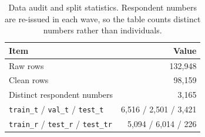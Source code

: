 \begin{table}[t]
\centering
\small
\begin{tabular}{lr}
\toprule
Item & Value \\
\midrule
Raw rows & 132,948 \\
Clean rows & 98,159 \\
Distinct respondent numbers & 3,165 \\
\texttt{train\_t} / \texttt{val\_t} / \texttt{test\_t} & 6,516 / 2,501 / 3,421 \\
\texttt{train\_r} / \texttt{test\_r} / \texttt{test\_tr} & 5,094 / 6,014 / 226 \\
\bottomrule
\end{tabular}
\caption{Data audit and split statistics. Respondent numbers are re-issued
in each wave, so the table counts distinct numbers rather than individuals.}
\label{tab:audit}
\end{table}
